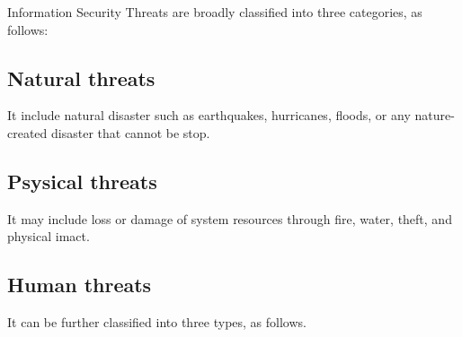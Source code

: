 Information Security Threats are broadly classified into three categories, as follows:
\subsection{Natural threats }
It include natural disaster such as earthquakes, hurricanes, floods, or any nature-created disaster that cannot be stop.
\subsection{Psysical threats}
It may include loss or damage of system resources through fire, water, theft, and physical imact.
\subsection{Human threats} 
It can be further classified into three types, as follows.

